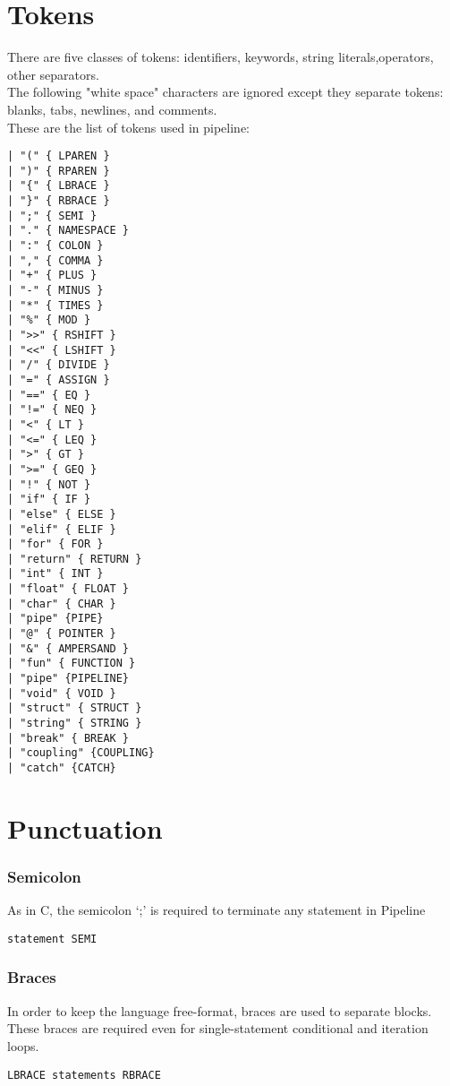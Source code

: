\documentclass[./LRM_main.tex]{subfiles}
\begin{document}
\section{Tokens}
There are five classes of tokens:
identifiers, keywords, string literals,operators, other separators.\\
The following "white space" characters are ignored except they separate tokens: blanks, tabs, newlines, and comments.\\
These are the list of tokens used in pipeline:\\
\begin{lstlisting}
| "(" { LPAREN } 
| ")" { RPAREN } 
| "{" { LBRACE } 
| "}" { RBRACE } 
| ";" { SEMI } 
| "." { NAMESPACE }
| ":" { COLON } 
| "," { COMMA } 
| "+" { PLUS } 
| "-" { MINUS }
| "*" { TIMES } 
| "%" { MOD } 
| ">>" { RSHIFT } 
| "<<" { LSHIFT } 
| "/" { DIVIDE } 
| "=" { ASSIGN } 
| "==" { EQ }
| "!=" { NEQ } 
| "<" { LT } 
| "<=" { LEQ } 
| ">" { GT } 
| ">=" { GEQ } 
| "!" { NOT } 
| "if" { IF } 
| "else" { ELSE } 
| "elif" { ELIF } 
| "for" { FOR } 
| "return" { RETURN } 
| "int" { INT }
| "float" { FLOAT } 
| "char" { CHAR }
| "pipe" {PIPE}
| "@" { POINTER } 
| "&" { AMPERSAND } 
| "fun" { FUNCTION } 
| "pipe" {PIPELINE}
| "void" { VOID } 
| "struct" { STRUCT } 
| "string" { STRING } 
| "break" { BREAK } 
| "coupling" {COUPLING}
| "catch" {CATCH}
\end{lstlisting}

\section{Punctuation}
\subsubsection{Semicolon}
As in C, the semicolon ‘;’ is required to terminate any statement in Pipeline
\begin{lstlisting}
statement SEMI
\end{lstlisting}

\subsubsection{Braces}
In order to keep the language free-format, braces are used to separate blocks. These braces are required even for single-statement conditional and iteration loops. 
\begin{lstlisting}
LBRACE statements RBRACE
\end{lstlisting}
\end{document}
